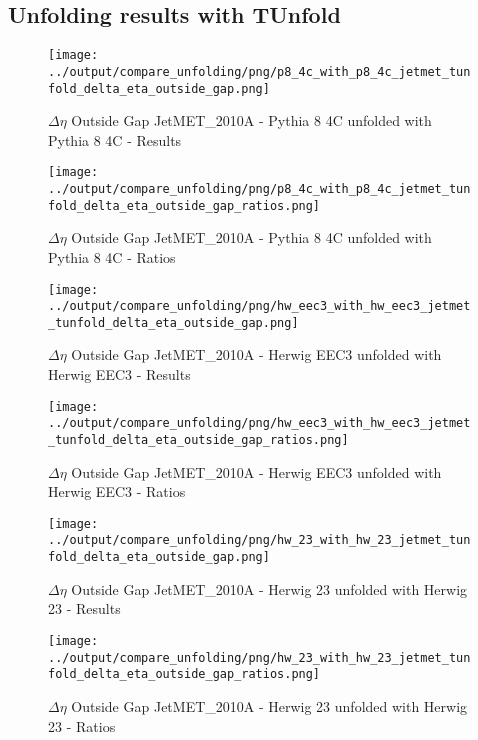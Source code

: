 \documentclass[11pt]{book}
\begin{document}
\clearpage
\subsection{Unfolding results with TUnfold}

\begin{figure}[ht]
\centering
\texttt{[image: ../output/compare\_unfolding/png/p8\_4c\_with\_p8\_4c\_jetmet\_tunfold\_delta\_eta\_outside\_gap.png]}
\caption{$\Delta\eta$ Outside Gap JetMET\_2010A - Pythia 8 4C unfolded with Pythia 8 4C - Results}
\label{p8_p8_jetmet_tunfold_delta_eta_outside_gap_a}
\end{figure}

\begin{figure}[ht]
\centering
\texttt{[image: ../output/compare\_unfolding/png/p8\_4c\_with\_p8\_4c\_jetmet\_tunfold\_delta\_eta\_outside\_gap\_ratios.png]}
\caption{$\Delta\eta$ Outside Gap JetMET\_2010A - Pythia 8 4C unfolded with Pythia 8 4C - Ratios}
\label{p8_p8_jetmet_tunfold_delta_eta_outside_gap_b}
\end{figure}

\begin{figure}[ht]
\centering
\texttt{[image: ../output/compare\_unfolding/png/hw\_eec3\_with\_hw\_eec3\_jetmet\_tunfold\_delta\_eta\_outside\_gap.png]}
\caption{$\Delta\eta$ Outside Gap JetMET\_2010A - Herwig EEC3 unfolded with Herwig EEC3 - Results}
\label{hw_eec3_hw_eec3_jetmet_tunfold_delta_eta_outside_gap_a}
\end{figure}

\begin{figure}[ht]
\centering
\texttt{[image: ../output/compare\_unfolding/png/hw\_eec3\_with\_hw\_eec3\_jetmet\_tunfold\_delta\_eta\_outside\_gap\_ratios.png]}
\caption{$\Delta\eta$ Outside Gap JetMET\_2010A - Herwig EEC3 unfolded with Herwig EEC3 - Ratios}
\label{hw_eec3_hw_eec3_jetmet_tunfold_delta_eta_outside_gap_b}
\end{figure}

\begin{figure}[ht]
\centering
\texttt{[image: ../output/compare\_unfolding/png/hw\_23\_with\_hw\_23\_jetmet\_tunfold\_delta\_eta\_outside\_gap.png]}
\caption{$\Delta\eta$ Outside Gap JetMET\_2010A - Herwig 23 unfolded with Herwig 23 - Results}
\label{hw_23_hw_23_jetmet_tunfold_delta_eta_outside_gap_a}
\end{figure}

\begin{figure}[ht]
\centering
\texttt{[image: ../output/compare\_unfolding/png/hw\_23\_with\_hw\_23\_jetmet\_tunfold\_delta\_eta\_outside\_gap\_ratios.png]}
\caption{$\Delta\eta$ Outside Gap JetMET\_2010A - Herwig 23 unfolded with Herwig 23 - Ratios}
\label{hw_23_hw_23_jetmet_tunfold_delta_eta_outside_gap_b}
\end{figure}




\listoffigures

 
\end{document}
